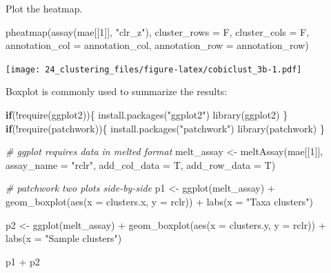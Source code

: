 \documentclass[
]{book}
\newenvironment{Shaded}{\begin{snugshade}}{\end{snugshade}}
\newcommand{\AttributeTok}[1]{\textcolor[rgb]{0.77,0.63,0.00}{#1}}
\newcommand{\CommentTok}[1]{\textcolor[rgb]{0.56,0.35,0.01}{\textit{#1}}}
\newcommand{\ControlFlowTok}[1]{\textcolor[rgb]{0.13,0.29,0.53}{\textbf{#1}}}
\newcommand{\DecValTok}[1]{\textcolor[rgb]{0.00,0.00,0.81}{#1}}
\newcommand{\FunctionTok}[1]{\textcolor[rgb]{0.00,0.00,0.00}{#1}}
\newcommand{\NormalTok}[1]{#1}
\newcommand{\OtherTok}[1]{\textcolor[rgb]{0.56,0.35,0.01}{#1}}
\newcommand{\SpecialCharTok}[1]{\textcolor[rgb]{0.00,0.00,0.00}{#1}}
\newcommand{\StringTok}[1]{\textcolor[rgb]{0.31,0.60,0.02}{#1}}
\begin{document}
Plot the heatmap.

\begin{Shaded}
\begin{Highlighting}[]
\FunctionTok{pheatmap}\NormalTok{(}\FunctionTok{assay}\NormalTok{(mae[[}\DecValTok{1}\NormalTok{]], }\StringTok{"clr\_z"}\NormalTok{), }\AttributeTok{cluster\_rows =}\NormalTok{ F, }\AttributeTok{cluster\_cols =}\NormalTok{ F, }
         \AttributeTok{annotation\_col =}\NormalTok{ annotation\_col,}
         \AttributeTok{annotation\_row =}\NormalTok{ annotation\_row)}
\end{Highlighting}
\end{Shaded}

\texttt{[image: 24\_clustering\_files/figure-latex/cobiclust\_3b-1.pdf]}

Boxplot is commonly used to summarize the results:

\begin{Shaded}
\begin{Highlighting}[]
\ControlFlowTok{if}\NormalTok{(}\SpecialCharTok{!}\FunctionTok{require}\NormalTok{(ggplot2))\{}
    \FunctionTok{install.packages}\NormalTok{(}\StringTok{"ggplot2"}\NormalTok{)}
    \FunctionTok{library}\NormalTok{(ggplot2)}
\NormalTok{\}}
\ControlFlowTok{if}\NormalTok{(}\SpecialCharTok{!}\FunctionTok{require}\NormalTok{(patchwork))\{}
    \FunctionTok{install.packages}\NormalTok{(}\StringTok{"patchwork"}\NormalTok{)}
    \FunctionTok{library}\NormalTok{(patchwork)}
\NormalTok{\}}

\CommentTok{\# ggplot requires data in melted format}
\NormalTok{melt\_assay }\OtherTok{\textless{}{-}} \FunctionTok{meltAssay}\NormalTok{(mae[[}\DecValTok{1}\NormalTok{]], }\AttributeTok{assay\_name =} \StringTok{"rclr"}\NormalTok{, }\AttributeTok{add\_col\_data =}\NormalTok{ T, }\AttributeTok{add\_row\_data =}\NormalTok{ T)}

\CommentTok{\# patchwork two plots side{-}by{-}side}
\NormalTok{p1 }\OtherTok{\textless{}{-}} \FunctionTok{ggplot}\NormalTok{(melt\_assay) }\SpecialCharTok{+}
  \FunctionTok{geom\_boxplot}\NormalTok{(}\FunctionTok{aes}\NormalTok{(}\AttributeTok{x =}\NormalTok{ clusters.x, }\AttributeTok{y =}\NormalTok{ rclr)) }\SpecialCharTok{+}
  \FunctionTok{labs}\NormalTok{(}\AttributeTok{x =} \StringTok{"Taxa clusters"}\NormalTok{)}

\NormalTok{p2 }\OtherTok{\textless{}{-}} \FunctionTok{ggplot}\NormalTok{(melt\_assay) }\SpecialCharTok{+}
  \FunctionTok{geom\_boxplot}\NormalTok{(}\FunctionTok{aes}\NormalTok{(}\AttributeTok{x =}\NormalTok{ clusters.y, }\AttributeTok{y =}\NormalTok{ rclr)) }\SpecialCharTok{+}
  \FunctionTok{labs}\NormalTok{(}\AttributeTok{x =} \StringTok{"Sample clusters"}\NormalTok{)}

\NormalTok{p1 }\SpecialCharTok{+}\NormalTok{ p2}
\end{Highlighting}
\end{Shaded}
\end{document}
